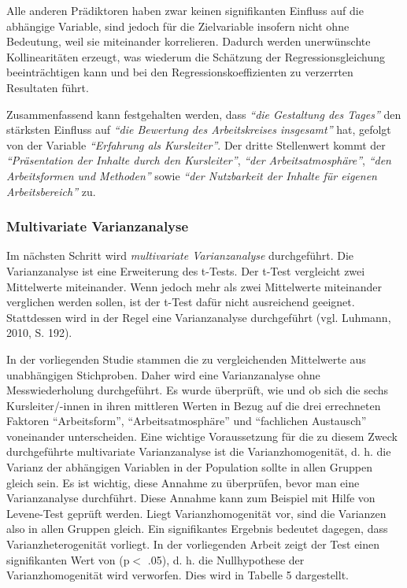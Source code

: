 \documentclass[12pt,a4paper]{article}
\begin{document}
Alle anderen Prädiktoren haben zwar keinen signifikanten Einfluss auf die abhängige Variable, sind jedoch für die Zielvariable insofern nicht ohne Bedeutung, weil sie miteinander korrelieren. Dadurch werden unerwünschte Kollinearitäten erzeugt, was wiederum die Schätzung der Regressionsgleichung beeinträchtigen kann und bei den Regressionskoeffizienten zu verzerrten Resultaten führt. 

Zusammenfassend kann festgehalten werden, dass \textit{"`die Gestaltung des Tages"'} den stärksten Einfluss auf \textit{"`die Bewertung des Arbeitskreises insgesamt"'} hat, gefolgt von der Variable \textit{"`Erfahrung als Kursleiter"'}. Der dritte Stellenwert kommt der \textit{"`Präsentation der Inhalte durch den Kursleiter"'}, \textit{"`der Arbeitsatmosphäre"'},  \textit{"`den Arbeitsformen und Methoden"'} sowie \textit{"`der Nutzbarkeit der Inhalte für eigenen Arbeitsbereich"'} zu. 

\subsubsection{Multivariate Varianzanalyse}

Im nächsten Schritt wird \textit{multivariate Varianzanalyse} durchgeführt. Die Varianzanalyse ist eine Erweiterung des t-Tests. Der t-Test vergleicht zwei Mittelwerte miteinander. Wenn jedoch mehr als zwei Mittelwerte miteinander verglichen werden sollen, ist der t-Test dafür nicht ausreichend geeignet. Stattdessen wird in der Regel eine Varianzanalyse durchgeführt (vgl. Luhmann, 2010, S. 192).


In der vorliegenden Studie stammen die zu vergleichenden Mittelwerte aus unabhängigen Stichproben. Daher wird eine Varianzanalyse ohne Messwiederholung durchgeführt. Es wurde überprüft, wie und ob sich die sechs Kurs\-lei\-ter/-innen in ihren mittleren Werten in Bezug auf die drei errechneten Faktoren "`Arbeitsform"', "`Arbeitsatmosphäre"' und "`fachlichen Austausch"' voneinander unterscheiden. Eine wichtige Voraussetzung für die zu diesem Zweck durchgeführte multivariate Varianzanalyse ist die Varianzhomogenität, d. h. die Varianz der abhängigen Variablen in der Population sollte in allen Gruppen gleich sein. Es ist wichtig, diese Annahme zu überprüfen, bevor man eine Varianzanalyse durchführt. Diese Annahme kann zum Beispiel mit Hilfe von Levene-Test geprüft werden. Liegt Varianzhomogenität vor, sind die Varianzen also in allen Gruppen gleich. Ein signifikantes Ergebnis bedeutet dagegen, dass Varianzheterogenität vorliegt. In der vorliegenden Arbeit zeigt der Test einen signifikanten Wert von (p$<$ .05), d. h. die Nullhypothese der Varianzhomogenität wird verworfen. 
Dies wird in Tabelle 5 dargestellt.
\end{document}

